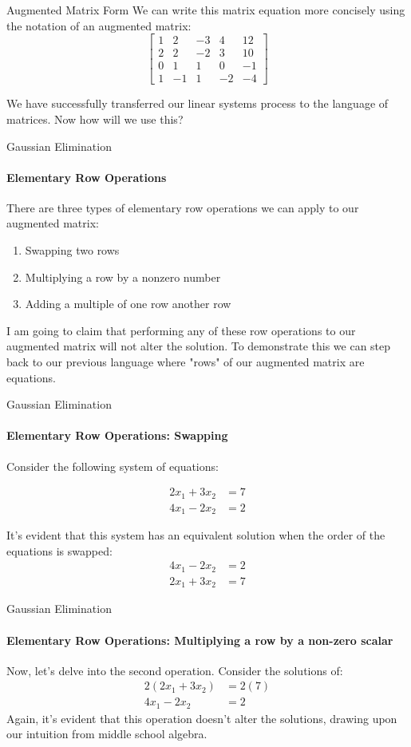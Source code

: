 \documentclass{beamer}
\begin{document}
\begin{frame}{Augmented Matrix Form}
We can write this matrix equation more concisely using the notation of an augmented matrix:
\[
\left[ 
    \begin{array}{cccc|c}
    1 & 2 & -3 & 4 & 12 \\
    2 & 2 & -2 & 3 & 10 \\
    0 & 1 & 1 & 0 & -1 \\
    1 & -1 & 1 & -2 & -4
    \end{array}
\right]
\]

We have successfully transferred our linear systems process to the language of matrices. Now how will we use this? 
\end{frame}

\begin{frame}{Gaussian Elimination}
\framesubtitle{Elementary Row Operations}
There are three types of elementary row operations we can apply to our augmented matrix:
\begin{enumerate}
    \item Swapping two rows
    \item Multiplying a row by a nonzero number
    \item Adding a multiple of one row another row
\end{enumerate}
I am going to claim that performing any of these row operations to our augmented matrix will not alter the solution. To demonstrate this we can step back to our previous language where "rows" of our augmented matrix are equations.
\end{frame}


\begin{frame}{Gaussian Elimination}
\framesubtitle{Elementary Row Operations: Swapping}
Consider the following system of equations:

\begin{align*}
    2x_1 + 3x_2 &= 7 \\
    4x_1 - 2x_2 &= 2
\end{align*}

It's evident that this system has an equivalent solution when the order of the equations is swapped:
\begin{align*}
    4x_1 - 2x_2 &= 2 \\
    2x_1 + 3x_2 &= 7
\end{align*}
\end{frame}

\begin{frame}{Gaussian Elimination}
\framesubtitle{Elementary Row Operations: Multiplying a row by a non-zero scalar}
Now, let's delve into the second operation. Consider the solutions of:
\begin{align*}
    2(2x_1 + 3x_2) &= 2(7) \\
    4x_1 - 2x_2 &= 2
\end{align*}
Again, it's evident that this operation doesn't alter the solutions, drawing upon our intuition from middle school algebra.
\end{frame}
\end{document}

